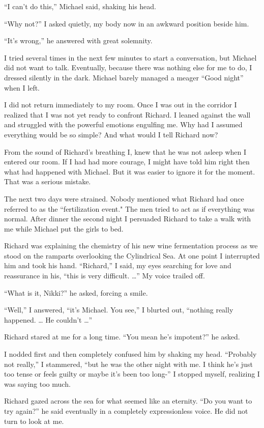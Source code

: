 \documentclass[]{article}
\begin{document}
“I can’t do this,” Michael said, shaking his head.

“Why not?” I asked quietly, my body now in an awkward position beside him.

“It’s wrong,” he answered with great solemnity.

I tried several times in the next few minutes to start a conversation, but Michael did not want to talk.  Eventually, because there was nothing else for me to do, I dressed silently in the dark.  Michael barely managed a meager “Good night” when I left.

I did not return immediately to my room.  Once I was out in the corridor I realized that I was not yet ready to confront Richard.  I leaned against the wall and struggled with the powerful emotions engulfing me.  Why had I assumed everything would be so simple? And what would I tell Richard now?

From the sound of Richard’s breathing I, knew that he was not asleep when I entered our room.  If I had had more courage, I might have told him right then what had happened with Michael.  But it was easier to ignore it for the moment.  That was a serious mistake.

The next two days were strained.  Nobody mentioned what Richard had once referred to as the “fertilization event."  The men tried to act as if everything was normal.  After dinner the second night I persuaded Richard to take a walk with me while Michael put the girls to bed.

Richard was explaining the chemistry of his new wine fermentation process as we stood on the ramparts overlooking the Cylindrical Sea.  At one point I interrupted him and took his hand.  “Richard,” I said, my eyes searching for love and reassurance in his, “this is very difficult.  …” My voice trailed off.

“What is it, Nikki?” he asked, forcing a smile.

“Well,” I answered, “it’s Michael.  You see,” I blurted out, “nothing really happened.  … He couldn’t …”

Richard stared at me for a long time.  “You mean he’s impotent?” he asked.

I nodded first and then completely confused him by shaking my head.  “Probably not really,” I stammered, “but he was the other night with me.  I think he’s just too tense or feels guilty or maybe it’s been too long-” I stopped myself, realizing I was saying too much.

Richard gazed across the sea for what seemed like an eternity.  “Do you want to try again?” he said eventually in a completely expressionless voice.  He did not turn to look at me.
\end{document}
